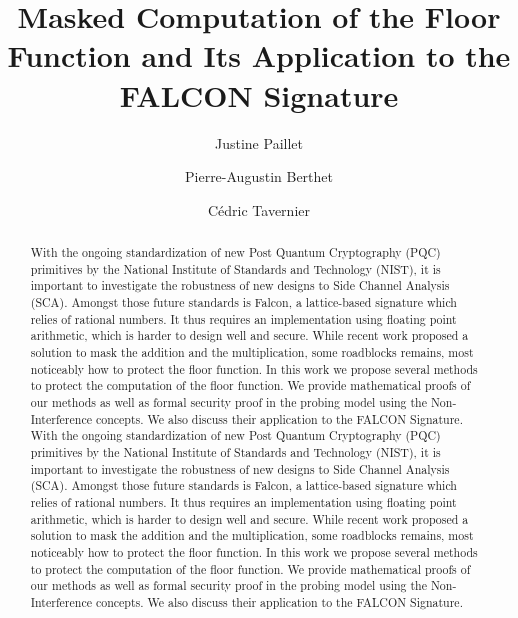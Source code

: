 \documentclass[runningheads]{llncs}
\begin{document}
%
\title{Masked Computation of the Floor Function and Its Application to the FALCON Signature}
%
%
\author{Justine Paillet \and
  Pierre-Augustin Berthet \and
C\'edric Tavernier}
%
%
%
\maketitle              %
%
\begin{abstract}
With the ongoing standardization of new Post Quantum Cryptography (PQC) primitives by the National Institute of Standards and Technology (NIST), it is important to investigate the robustness of new designs to Side Channel Analysis (SCA). Amongst those future standards is Falcon, a lattice-based signature which relies of rational numbers. It thus requires an implementation using floating point arithmetic, which is harder to design well and secure. While recent work proposed a solution to mask the addition and the multiplication, some roadblocks remains, most noticeably how to protect the floor function. In this work we propose several methods to protect the computation of the floor function. We provide mathematical proofs of our methods as well as formal security proof in the probing model using the Non-Interference concepts. We also discuss their application to the FALCON Signature.
With the ongoing standardization of new Post Quantum Cryptography (PQC) primitives by the National Institute of Standards and Technology (NIST), it is important to investigate the robustness of new designs to Side Channel Analysis (SCA). Amongst those future standards is Falcon, a lattice-based signature which relies of rational numbers. It thus requires an implementation using floating point arithmetic, which is harder to design well and secure. While recent work proposed a solution to mask the addition and the multiplication, some roadblocks remains, most noticeably how to protect the floor function. In this work we propose several methods to protect the computation of the floor function. We provide mathematical proofs of our methods as well as formal security proof in the probing model using the Non-Interference concepts. We also discuss their application to the FALCON Signature.

\end{abstract}
%
%
%
\end{document}

